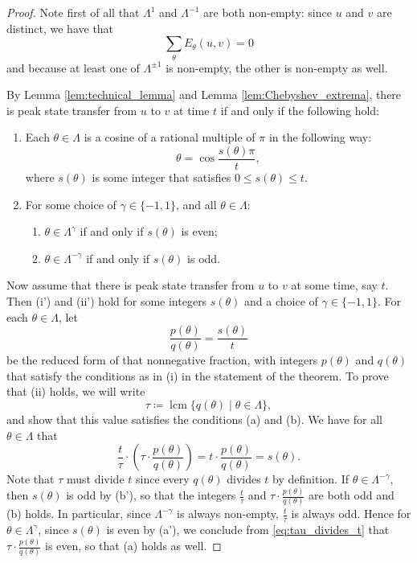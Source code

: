 \documentclass{article}
\numberwithin{equation}{section}
\DeclareMathOperator{\lcm}{lcm}
\begin{document}
\begin{proof}
Note first of all that $\Lambda^1$ and $\Lambda^{-1}$ are both non-empty: since $u$ and $v$ are distinct, we have that
\[
\sum_\theta E_\theta(u,v) = 0
\]
and because at least one of $\Lambda^{\pm 1}$ is non-empty, the other is non-empty as well.

By Lemma \ref{lem:technical_lemma} and Lemma  \ref{lem:Chebyshev_extrema}, there is peak state transfer from $u$ to $v$ at time $t$ if and only if the following hold:
\begin{enumerate}[(i')]
\item Each $\theta \in \Lambda$ is a cosine of a rational multiple of $\pi$ in the following way:
\[
\theta = \cos\frac{s(\theta)\pi}{t},
\]
where $s(\theta)$ is some integer that satisfies $0 \leq s(\theta) \leq t$.
\item For some choice of $\gamma \in \{-1,1\}$, and all $\theta \in \Lambda$:
\begin{enumerate}[(a')]
    \item $\theta \in \Lambda^\gamma$ if and only if $s(\theta)$ is even;
    \item $\theta \in \Lambda^{-\gamma}$ if and only if $s(\theta)$ is odd.
\end{enumerate}
\end{enumerate}

Now assume that there is peak state transfer from $u$ to $v$ at some time, say $t$. Then (i') and (ii') hold for some integers $s(\theta)$ and a choice of $\gamma \in \{-1,1\}$. For each $\theta \in \Lambda$, let
\[
\frac{p(\theta)}{q(\theta)} = \frac{s(\theta)}{t}
\]
be the reduced form of that nonnegative fraction, with integers $p(\theta)$ and $q(\theta)$ that satisfy the conditions as in (i) in the statement of the theorem. To prove that (ii) holds, we will write
\[
\tau \coloneq \lcm\{q(\theta) \mid \theta \in \Lambda\},
\]
and show that this value satisfies the conditions (a) and (b). We have for all $\theta \in \Lambda$ that
\begin{equation}
\label{eq:tau_divides_t}
\frac{t}{\tau}\cdot \left(\tau \cdot \frac{p(\theta)}{q(\theta)}\right) = t\cdot \frac{p(\theta)}{q(\theta)} = s(\theta).
\end{equation}
Note that $\tau$ must divide $t$ since every $q(\theta)$ divides $t$ by definition. If $\theta \in \Lambda^{-\gamma}$, then $s(\theta)$ is odd by (b'), so that the integers $\frac{t}{\tau}$ and $\tau \cdot \frac{p(\theta)}{q(\theta)}$ are both odd and (b) holds. In particular, since $\Lambda^{-\gamma}$ is always non-empty, $\frac{t}{\tau}$ is always odd. Hence for $\theta \in \Lambda^\gamma$, since $s(\theta)$ is even by (a'), we conclude from \eqref{eq:tau_divides_t} that $\tau \cdot \frac{p(\theta)}{q(\theta)}$ is even, so that (a) holds as well.


\end{proof}
\end{document}

